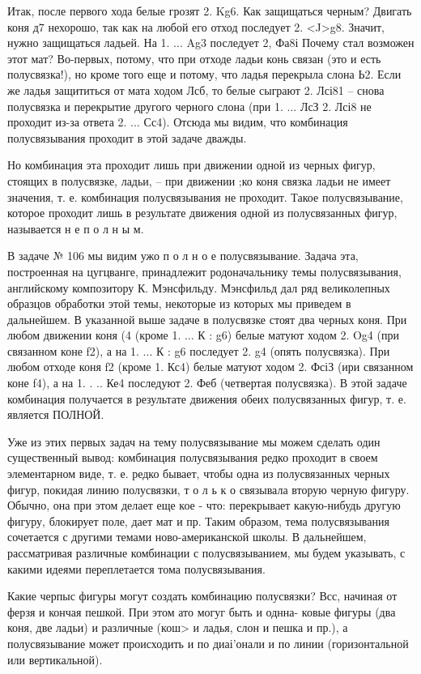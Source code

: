 Итак, после первого хода белые грозят 2. Kg6. Как защищаться черным? Двигать коня д7 нехорошо, так как на любой его отход последует 2. <J>g8. Значит, нужно защищаться ладьей. На 1. ... Ag3 последует 2, Фа8і Почему стал возможен этот мат? Во-первых, потому, что при отходе ладьи конь связан (это и есть полусвязка!), но кроме того еще и потому, что ладья перекрыла слона Ь2. Если же ладья защититься от мата ходом Лсб, то белые сыграют 2. Лсі81 -- снова полусвязка и перекрытие другого черного слона (при 1. ... ЛсЗ 2. Лсі8 не проходит из-за ответа 2. ... Сс4). Отсюда мы видим, что комбинация полусвязывания проходит в этой задаче дважды.

Но комбинация эта проходит лишь при движении одной из черных фигур, стоящих в полусвязке, ладьи, -- при движении ;ко коня связка ладьи не имеет значения, т. е. комбинация полусвязывания не проходит. Такое полусвязывание, которое проходит лишь в результате движения одной из полусвязанных фигур, называется н е п о л н ы м.

В задаче № 106 мы видим ужо п о л н о е полусвязывание. Задача эта, построенная на цугцванге, принадлежит родоначальнику темы полусвязывания, английскому композитору К. Мэнсфильду. Мэнсфильд дал ряд великолепных образцов обработки этой темы, некоторые из которых мы приведем в дальнейшем. В указанной выше задаче в полусвязке стоят два черных коня. При любом движении коня (4 (кроме 1. ... К : g6) белые матуют ходом 2. Og4 (при связанном коне f2), а на 1. ... К : g6 последует 2. g4 (опять полусвязка). При любом отходе коня f2 (кроме 1. Кс4) белые матуют ходом 2. ФсіЗ (ири связанном коне f4), а на 1. . .. Ке4 последуют 2. Феб (четвертая полусвязка). В этой задаче комбинация получается в результате движения обеих полусвязанных фигур, т. е. является ПОЛНОЙ.

Уже из этих первых задач на тему полусвязывание мы можем сделать один существенный вывод: комбинация полусвязывания редко проходит в своем элементарном виде, т. е. редко бывает, чтобы одна из полусвязанных черных фигур, покидая линию полусвязки, т о л ь к о связывала вторую черную фигуру. Обычно, она при этом делает еще кое - что: перекрывает какую-нибудь другую фигуру, блокирует поле, дает мат и пр. Таким образом, тема полусвязывания сочетается с другими темами ново-американской школы. В дальнейшем, рассматривая различные комбинации с полусвязыванием, мы будем указывать, с какими идеями переплетается тома полусвязывания.

Какие черпыс фигуры могут создать комбинацию полусвязки? Всс, начиная от ферзя и кончая пешкой. При этом ато могуг быть и однна- ковые фигуры (два коня, две ладьи) и различные (кош> и ладья, слон и пешка и пр.), а полусвязывание может происходить и по диаі’онали и по линии (горизонтальной или вертикальной).


